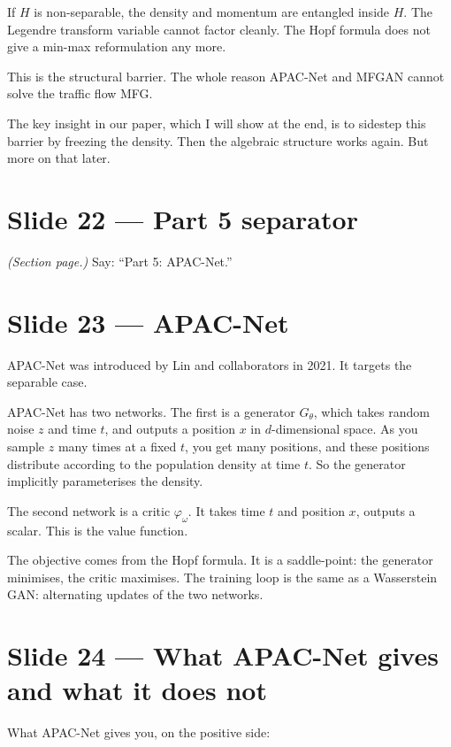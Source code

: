 \documentclass[11pt]{article}
\begin{document}
If $H$ is non-separable, the density and momentum are entangled inside $H$.
The Legendre transform variable cannot factor cleanly. The Hopf formula does
not give a min-max reformulation any more.

This is the structural barrier. The whole reason APAC-Net and MFGAN cannot
solve the traffic flow MFG.

The key insight in our paper, which I will show at the end, is to sidestep
this barrier by freezing the density. Then the algebraic structure works
again. But more on that later.

\section*{Slide 22 --- Part 5 separator}

\textit{(Section page.)}  Say: ``Part 5: APAC-Net.''

\section*{Slide 23 --- APAC-Net}

APAC-Net was introduced by Lin and collaborators in 2021. It targets the
separable case.

APAC-Net has two networks. The first is a generator $G_\theta$, which takes
random noise $z$ and time $t$, and outputs a position $x$ in $d$-dimensional
space. As you sample $z$ many times at a fixed $t$, you get many positions,
and these positions distribute according to the population density at time
$t$. So the generator implicitly parameterises the density.

The second network is a critic $\varphi_\omega$. It takes time $t$ and
position $x$, outputs a scalar. This is the value function.

The objective comes from the Hopf formula. It is a saddle-point: the
generator minimises, the critic maximises. The training loop is the same as
a Wasserstein GAN: alternating updates of the two networks.

\section*{Slide 24 --- What APAC-Net gives and what it does not}

What APAC-Net gives you, on the positive side:
\end{document}
